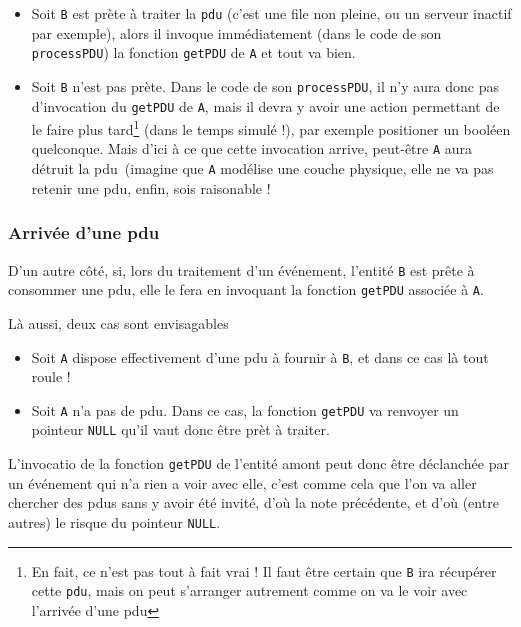 \begin{itemize}
   \item Soit {\tt B} est prète à traiter la {\tt pdu} (c'est une file
     non pleine, ou un serveur inactif par exemple), alors il invoque
     immédiatement (dans le code de son \lstinline!processPDU!) la
     fonction \lstinline!getPDU! de {\tt A} et tout va bien.
   \item Soit {\tt B} n'est pas prète. Dans le code de son
     \lstinline!processPDU!, il n'y aura donc pas d'invocation du
     \lstinline!getPDU! de {\tt A}, mais il devra y avoir une action
     permettant de le faire plus tard\footnote{En fait, ce n'est pas
       tout à fait vrai ! Il faut être certain que {\tt B} ira
       récupérer cette {\tt pdu}, mais on peut s'arranger autrement
       comme on va le voir avec l'arrivée d'une {\sc pdu}} (dans le temps simulé !), par
     exemple positioner un booléen quelconque. Mais d'ici à ce que
     cette invocation arrive, peut-être {\tt A} aura détruit la {\sc
       pdu} (imagine que {\tt A} modélise une couche physique, elle ne
     va pas retenir une {\sc pdu}, enfin, sois raisonable !
\end{itemize}

%
\subsubsection{Arrivée d'une {\sc pdu}}

   D'un autre côté, si, lors du traitement d'un événement, l'entité
{\tt B} est prête à consommer une {\sc pdu}, elle le fera en invoquant
la fonction \lstinline!getPDU! associée à {\tt A}.

   Là aussi, deux cas sont envisagables

\begin{itemize}
   \item Soit {\tt A} dispose effectivement d'une {\sc pdu} à fournir
     à {\tt B}, et dans ce cas là tout roule !
   \item Soit {\tt A} n'a pas de {\sc pdu}. Dans ce cas, la fonction
     \lstinline!getPDU! va renvoyer un pointeur \lstinline!NULL! qu'il
     vaut donc être prèt à traiter.
\end{itemize}

   L'invocatio de la fonction \lstinline!getPDU! de l'entité amont
peut donc être déclanchée par un événement qui n'a rien a voir avec
elle, c'est comme cela que l'on va aller chercher des {\sc pdu}s sans
y avoir été invité, d'où la note précédente, et d'où (entre autres) le
risque du pointeur \lstinline!NULL!.

